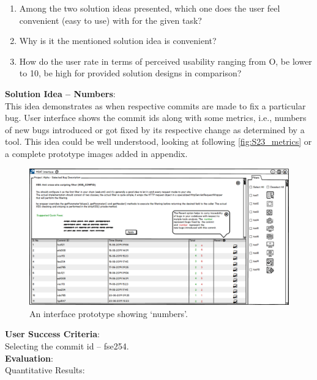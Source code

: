 \begin{enumerate}
\item Among the two solution ideas presented, which one does the user feel convenient (easy to use) with for the given task?
\item Why is it the mentioned solution idea is convenient?
\item How do the user rate in terms of perceived usability ranging from O, be lower to 10, be high for provided solution designs in comparison?
\end{enumerate}

\textbf{Solution Idea – Numbers}: \\

This idea demonstrates as when respective commits are made to fix a particular bug. User interface shows the commit ids along with some metrics, i.e., numbers of new bugs introduced or got fixed by its respective change as determined by a tool. This idea could be well understood, looking at following \autoref{fig:S23_metrics} or a complete prototype images added in appendix. \\


\begin{figure}[hbt!]
	\centering
	\includegraphics[width=\linewidth]{figures/solution_ideas_snaps/S23_metrics}
	\caption{An interface prototype showing ‘numbers’.}
	\label{fig:S23_metrics}
\end{figure}

\textbf{User Success Criteria}: \\

Selecting the commit id – fse254. \\

\textbf{Evaluation}: \\

Quantitative Results: \\

